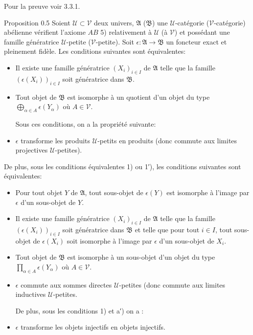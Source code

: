 Pour la preuve\sisi{}{,} voir \cite{11} 3.3.1.

\begin{enonce*}{Proposition 0.5}
Soient $𝒰 \subset 𝒱$ deux univers, $\mathfrak{A}$
(\resp $\mathfrak{B}$) une $𝒰$-catégorie (\resp $𝒱$-catégorie)
abélienne vérifient l'axiome $AB$ 5) relativement à $𝒰$
(\resp à $𝒱$) et possédant une famille génératrice $𝒰$-petite
(\resp $𝒱$-petite). Soit $\epsilon : \mathfrak{A} \to \mathfrak{B}$
un foncteur exact et pleinement fidèle. Les conditions suivantes
sont équivalentes:
\begin{itemize}
\item[1)] Il existe une famille génératrice $(X_i)_{i\in I}$ de
  $\mathfrak{A}$ telle que la famille $(\epsilon(X_i))_{i\in I}$
  soit génératrice dans $\mathfrak{B}$.

\item[1′)] Tout objet de $\mathfrak{B}$ est isomorphe à un quotient
  d'un objet du type $\displaystyle{⨁_{\alpha \in A}} \epsilon
  (Y_\alpha)$ où $A \in 𝒱$.

   Sous ces conditions, on a la propriété suivante:

\item [2)] $\epsilon$ transforme les produits $𝒰$-petits en
  produits (donc commute aux limites projectives $𝒰$-petites).
\end{itemize}

De plus, sous les conditions équivalentes 1) ou 1′), les conditions
suivantes sont équivalentes\pageoriginale:
\begin{itemize}
\item[a)] Pour tout objet $Y$ de $\mathfrak{A}$, tout sous-objet de
  $\epsilon(Y)$ est isomorphe à l'image par $\epsilon$ d'un
  sous-objet de $Y$.

\item[a′)] Il existe une famille génératrice $(X_i)_{i \in I}$ de
  $\mathfrak{A}$ telle que la famille $(\epsilon(X_i))_{i \in I}$
  soit génératrice dans $\mathfrak{B}$ et telle que pour tout $i
  \in I$, tout sous-objet de $\epsilon(X_i)$ soit isomorphe à
  l'image par $\epsilon$ d'un sous-objet de $X_i$.

\item[b)] Tout objet de $\mathfrak{B}$ est isomorphe à un sous-objet d'un
  objet du type $\prod_{\alpha \in A} \epsilon(Y_\alpha)$ où
  $A \in 𝒱$.

\item[c)] $\epsilon$ commute aux sommes directes $𝒰$-petites (donc
  commute aux limites inductives $𝒰$-petites.

De plus, sous les conditions 1) et a′) on a :

\item[d)] $\epsilon$ transforme les objets injectifs en objets injectifs.
\end{itemize}
\end{enonce*}

